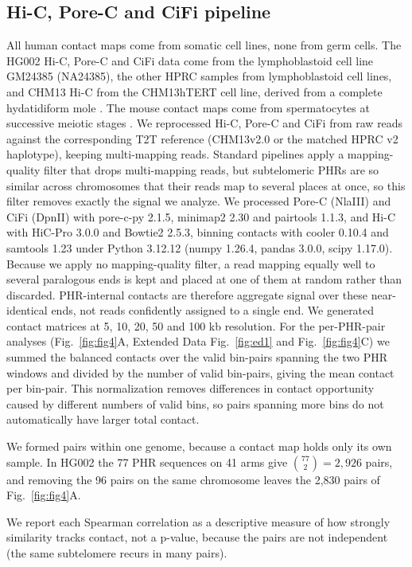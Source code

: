 \documentclass[pdflatex,mathphys]{jnl}
\begin{document}
\subsection*{Hi-C, Pore-C and CiFi pipeline}

All human contact maps come from somatic cell lines, none from germ cells. The HG002 Hi-C, Pore-C
and CiFi data come from the lymphoblastoid cell line GM24385 (NA24385), the other HPRC samples from
lymphoblastoid cell lines, and CHM13 Hi-C from the CHM13hTERT cell line, derived from a complete
hydatidiform mole \cite{Nurk2022}. The mouse contact maps come from spermatocytes at successive
meiotic stages \cite{Zuo2021}.
We reprocessed Hi-C, Pore-C and CiFi from raw reads
against the corresponding T2T reference (CHM13v2.0 or the matched HPRC v2
haplotype), keeping multi-mapping reads. Standard pipelines apply a
mapping-quality filter that drops multi-mapping reads, but subtelomeric PHRs are
so similar across chromosomes that their reads map to several places at once, so
this filter removes exactly the signal we analyze. We processed Pore-C (NlaIII) and CiFi (DpnII) with pore-c-py 2.1.5, minimap2 2.30 and pairtools 1.1.3, and Hi-C with HiC-Pro 3.0.0 and
Bowtie2 2.5.3, binning contacts with cooler 0.10.4 and samtools 1.23 under Python 3.12.12 (numpy 1.26.4, pandas 3.0.0, scipy 1.17.0). Because we apply no mapping-quality filter, a read mapping equally well to
several paralogous ends is kept and placed at one of them at random rather than
discarded. PHR-internal contacts are therefore aggregate signal over these
near-identical ends, not reads confidently assigned to a single end. We generated contact matrices at 5, 10, 20, 50 and 100 kb resolution.
For the per-PHR-pair analyses (Fig.~\ref{fig:fig4}A, Extended Data
Fig.~\ref{fig:ed1} and Fig.~\ref{fig:fig4}C) we summed the balanced contacts over
the valid bin-pairs spanning the two PHR windows and divided by the number of
valid bin-pairs, giving the mean contact per bin-pair. This normalization removes
differences in contact opportunity caused by different numbers of valid bins, so
pairs spanning more bins do not automatically have larger total contact.

We formed pairs within one genome, because a contact map holds only its own sample. In HG002 the
77 PHR sequences on 41 arms give $\binom{77}{2} = 2{,}926$ pairs, and removing the 96 pairs on the
same chromosome leaves the 2,830 pairs of Fig.~\ref{fig:fig4}A.

We report each Spearman correlation as a descriptive measure of how strongly
similarity tracks contact, not a p-value, because the pairs are not independent
(the same subtelomere recurs in many pairs).
\end{document}
